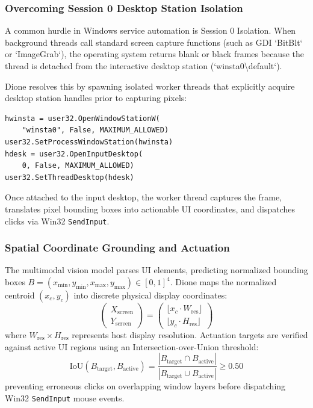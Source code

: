 \documentclass[conference,a4paper]{IEEEtran}
\begin{document}
\subsubsection{Overcoming Session 0 Desktop Station Isolation}
A common hurdle in Windows service automation is Session 0 Isolation. When background threads call standard screen capture functions (such as GDI `BitBlt` or `ImageGrab`), the operating system returns blank or black frames because the thread is detached from the interactive desktop station (`winsta0\textbackslash default`).

Dione resolves this by spawning isolated worker threads that explicitly acquire desktop station handles prior to capturing pixels:
\begin{verbatim}
hwinsta = user32.OpenWindowStationW(
    "winsta0", False, MAXIMUM_ALLOWED)
user32.SetProcessWindowStation(hwinsta)
hdesk = user32.OpenInputDesktop(
    0, False, MAXIMUM_ALLOWED)
user32.SetThreadDesktop(hdesk)
\end{verbatim}
Once attached to the input desktop, the worker thread captures the frame, translates pixel bounding boxes into actionable UI coordinates, and dispatches clicks via Win32 \texttt{SendInput}.

\subsubsection{Spatial Coordinate Grounding and Actuation}
The multimodal vision model parses UI elements, predicting normalized bounding boxes $B = (x_{\text{min}}, y_{\text{min}}, x_{\text{max}}, y_{\text{max}}) \in [0, 1]^4$. Dione maps the normalized centroid $(x_c, y_c)$ into discrete physical display coordinates:
\begin{equation}
\begin{pmatrix} X_{\text{screen}} \\ Y_{\text{screen}} \end{pmatrix} = \begin{pmatrix} \lfloor x_c \cdot W_{\text{res}} \rfloor \\ \lfloor y_c \cdot H_{\text{res}} \rfloor \end{pmatrix}
\end{equation}
where $W_{\text{res}} \times H_{\text{res}}$ represents host display resolution. Actuation targets are verified against active UI regions using an Intersection-over-Union threshold:
\begin{equation}
\text{IoU}(B_{\text{target}}, B_{\text{active}}) = \frac{|B_{\text{target}} \cap B_{\text{active}}|}{|B_{\text{target}} \cup B_{\text{active}}|} \ge 0.50
\end{equation}
preventing erroneous clicks on overlapping window layers before dispatching Win32 \texttt{SendInput} mouse events.
\end{document}
